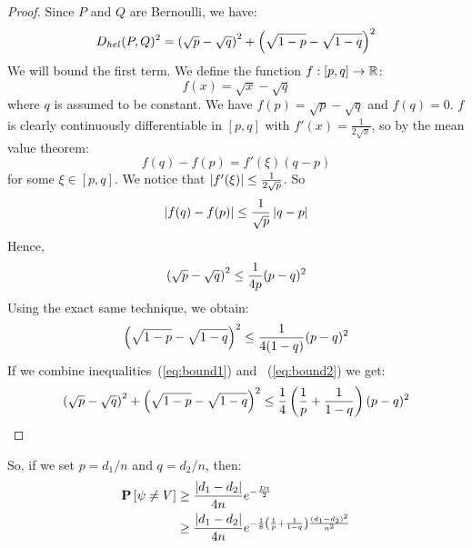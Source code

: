 \begin{proof}
Since $P$ and $Q$ are Bernoulli, we have:
$$
D_{hel}(P,Q)^2 = \left(\sqrt{p}-\sqrt{q}\right)^2 + \left(\sqrt{1-p}- \sqrt{1-q}\right)^2
$$
We will bound the first term. We define the function $f:[p,q]\to \mathbb{R}$:
$$
f(x) = \sqrt{x} - \sqrt{q}
$$
where $q$ is assumed to be constant. We have $f(p) = \sqrt{p} - \sqrt{q}$ and $ f(q) = 0$.
$f$ is clearly continuously differentiable in $[p,q] $ with $f'(x) = \frac{1}{2\sqrt{x}}$, 
so by the mean value theorem:
$$
f(q)-f(p) = f'(\xi) (q-p)
$$
for some $\xi \in [p,q]$. We notice that $\left|f'(\xi)\right| \leq \frac{1}{2\sqrt{p}}$. So
$$
\left|f(q)-f(p)\right| \leq  \frac{1}{\sqrt{p}}\left|q-p\right|
$$
Hence,
\begin{equation}\label{eq:bound1}
\left(\sqrt{p} - \sqrt{q}\right)^2 \leq \frac{1}{4p}(p-q)^2
\end{equation}
Using the exact same technique, we obtain:
\begin{equation}\label{eq:bound2}
\left(\sqrt{1-p} - \sqrt{1-q}\right)^2 \leq \frac{1}{4(1-q)}(p-q)^2
\end{equation}
If we combine inequalities~(\ref{eq:bound1}) and ~(\ref{eq:bound2}) we get:
$$
\left(\sqrt{p} - \sqrt{q}\right)^2 + \left(\sqrt{1-p}- \sqrt{1-q}\right)^2 \leq \frac{1}{4}\left(\frac{1}{p} + \frac{1}{1-q}\right)(p-q)^2
$$ 
\end{proof}
So, if we set $p = d_1/n$ and $q = d_2/n$, then:
\begin{align*}
\bm{\mathrm{P}}\left[\psi \neq V\right] &\geq \frac{\left|d_1 - d_2\right|}{4n} e^{-\frac{Dt}{2}}\\
&\geq \frac{\left|d_1 - d_2\right|}{4n}e^{-\frac{1}{8}\left(\frac{1}{p} + \frac{1}{1-q}\right)\frac{(d_1 - d_2)^2}{n^2}}
\end{align*}
